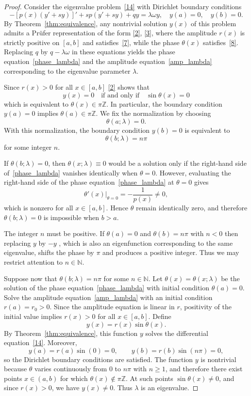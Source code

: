 \documentclass[11pt, reqno]{amsart}
\numberwithin{equation}{section}  %
\theoremstyle{plain}
\theoremstyle{definition}
\theoremstyle{remark}
\begin{document}
\begin{proof}
Consider the eigenvalue problem~\eqref{14} with Dirichlet boundary conditions
\[
-[p(x)(y' + sy)]' + sp(y' + sy) + qy = \lambda\omega y, \quad y(a) = 0, \quad y(b) = 0.
\]
By Theorem~\ref{thm:equivalence}, any nontrivial solution $y(x)$ of this problem admits a Pr\"ufer representation of the form \eqref{2}, \eqref{3}, where the amplitude $r(x)$ is strictly positive on $[a,b]$ and satisfies~\eqref{7}, while the phase $\theta(x)$ satisfies~\eqref{8}. Replacing $q$ by $q - \lambda\omega$ in these equations yields the phase equation~\eqref{phase_lambda} and the amplitude equation~\eqref{amp_lambda} corresponding to the eigenvalue parameter $\lambda$. 

Since  $r(x)>0$ for all $x \in [a,b]$ \eqref{2} shows that 
\[
y(x) = 0 \quad \text{if and only if} \quad \sin\theta(x) = 0
\]
which is equivalent to $\theta(x) \in \pi\mathbb{Z}$. In particular, the boundary condition $y(a) = 0$ implies $\theta(a) \in \pi\mathbb{Z}$. We fix the normalization by choosing
\[
\theta(a; \lambda) = 0.
\]
With this normalization, the boundary condition $y(b) = 0$ is equivalent to
\[
\theta(b; \lambda) = n\pi
\]
for some integer $n$. 

If $\theta(b; \lambda) = 0$, then $\theta(x; \lambda) \equiv 0$ would be a solution only if the right-hand side of~\eqref{phase_lambda} vanishes identically when $\theta = 0$. However, evaluating the right-hand side of the phase equation~\eqref{phase_lambda} at $\theta=0$ gives 
\[
\theta'(x)\big|_{\theta=0} = -\frac{1}{p(x)} \neq 0,
\]
which is nonzero for all $x \in [a,b]$. Hence $\theta$ remain identically zero, and therefore 
$\theta(b; \lambda) = 0$ is impossible when $b > a$. 

The integer $n$ must be positive.  If $\theta(a) = 0$ and $\theta(b) = n\pi$ with $n < 0$ then replacing $y$ by $-y$ , which is also an eigenfunction corresponding to the same eigenvalue, shifts the phase by $\pi$ and produces a positive integer. Thus we may restrict attention to $n \in \mathbb{N}$. 

Suppose now that $\theta(b; \lambda) = n\pi$ for some $n \in \mathbb{N}$. Let $\theta(x) = \theta(x; \lambda)$ be the solution of the phase equation~\eqref{phase_lambda} with initial condition $\theta(a) = 0$. Solve the amplitude equation~\eqref{amp_lambda} with an initial condition $r(a) = r_0 > 0$. Since the amplitude equation is linear in $r$, positivity of the initial value implies $r(x) > 0$ for all $x \in [a,b]$. Define
\[
y(x) = r(x)\sin\theta(x).
\]
By Theorem~\ref{thm:equivalence}, this function $y$ solves the differential equation~\eqref{14}. Moreover,
\[
y(a) = r(a)\sin(0) = 0, \qquad y(b) = r(b)\sin(n\pi) = 0,
\]
so the Dirichlet boundary conditions are satisfied. The function $y$  is nontrivial because $\theta$ varies continuously from $0$ to $n\pi$ with $n \geq 1$, and therefore there exist points $x \in (a,b)$ for which $\theta(x) \notin \pi\mathbb{Z}$. At such points $\sin\theta(x) \neq 0$, and since $r(x) > 0$, we have $y(x) \neq 0$.  Thus $\lambda$ is an eigenvalue.


\end{proof}
\end{document}
